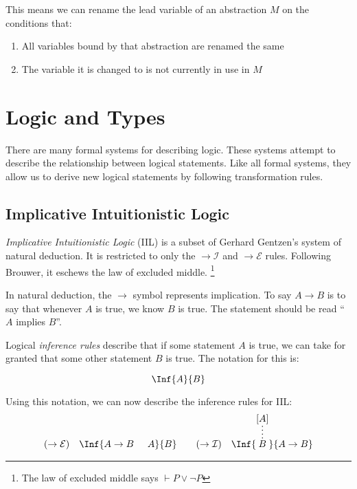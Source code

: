   This means we can rename the lead variable of an abstraction $M$ on the 
  conditions that: 
  \begin{enumerate}
    \item All variables bound by that abstraction are renamed the same 
    \item The variable it is changed to is not currently in use in $M$ 
  \end{enumerate}
  
  

\section{Logic and Types}

  There are many formal systems for describing logic.
  These systems attempt to describe the relationship between logical statements.
  Like all formal systems, 
  they allow us to derive new logical statements by following transformation rules.

  \subsection{Implicative Intuitionistic Logic}
  \emph{Implicative Intuitionistic Logic} (IIL) is a subset of Gerhard Gentzen's system of natural deduction.
  It is restricted to only the $\rightarrow \mathcal{I}$ and $\rightarrow \mathcal{E}$ rules.
  Following Brouwer, it eschews the law of excluded middle.
  \footnote{The law of excluded middle says $\vdash P \lor \neg P$}
  
  In natural deduction, the $\to$ symbol represents implication.
  To say $A \to B$ is to say that whenever $A$ is true,
  we know $B$ is true.
  The statement should be read ``$A$ implies $B$''.
  
  Logical \emph{inference rules} describe that if some statement $A$ is true,
  we can take for granted that some other statement $B$ is true.
  The notation for this is:
  
  \[
    \Inf{A}{B} 
  \]
  
  Using this notation, we can now describe the inference rules for IIL:
  \[
  \begin{array}{rl@{\quad\quad}rl}
    ( \to \mathcal{E} ) &
    \Inf { A \to B \hspace{0.5cm} A }
        {B}
    &
    ( \to \mathcal{I} ) &
    \Inf { \infer*{B}{[A]} }
        { A \to B}
  \end{array}
  \]
  
